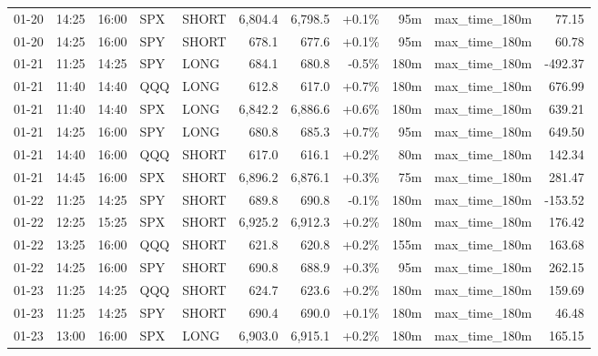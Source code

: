 \documentclass[11pt,a4paper,twoside]{article}
\begin{document}
\begin{center}
\begin{longtable}{>{\color{txtmain}}l l l l l r r r r >{\color{txtmain}}l r}
01-20 & 14:25 & 16:00 & SPX & SHORT & 6,804.4 & 6,798.5 & \textcolor{wingreen}{+0.1\%} & 95m & max\_time\_180m & \textcolor{wingreen}{77.15} \\
01-20 & 14:25 & 16:00 & SPY & SHORT & 678.1 & 677.6 & \textcolor{wingreen}{+0.1\%} & 95m & max\_time\_180m & \textcolor{wingreen}{60.78} \\
01-21 & 11:25 & 14:25 & SPY & LONG & 684.1 & 680.8 & \textcolor{lossred}{-0.5\%} & 180m & max\_time\_180m & \textcolor{lossred}{-492.37} \\
01-21 & 11:40 & 14:40 & QQQ & LONG & 612.8 & 617.0 & \textcolor{wingreen}{+0.7\%} & 180m & max\_time\_180m & \textcolor{wingreen}{676.99} \\
01-21 & 11:40 & 14:40 & SPX & LONG & 6,842.2 & 6,886.6 & \textcolor{wingreen}{+0.6\%} & 180m & max\_time\_180m & \textcolor{wingreen}{639.21} \\
01-21 & 14:25 & 16:00 & SPY & LONG & 680.8 & 685.3 & \textcolor{wingreen}{+0.7\%} & 95m & max\_time\_180m & \textcolor{wingreen}{649.50} \\
01-21 & 14:40 & 16:00 & QQQ & SHORT & 617.0 & 616.1 & \textcolor{wingreen}{+0.2\%} & 80m & max\_time\_180m & \textcolor{wingreen}{142.34} \\
01-21 & 14:45 & 16:00 & SPX & SHORT & 6,896.2 & 6,876.1 & \textcolor{wingreen}{+0.3\%} & 75m & max\_time\_180m & \textcolor{wingreen}{281.47} \\
01-22 & 11:25 & 14:25 & SPY & SHORT & 689.8 & 690.8 & \textcolor{lossred}{-0.1\%} & 180m & max\_time\_180m & \textcolor{lossred}{-153.52} \\
01-22 & 12:25 & 15:25 & SPX & SHORT & 6,925.2 & 6,912.3 & \textcolor{wingreen}{+0.2\%} & 180m & max\_time\_180m & \textcolor{wingreen}{176.42} \\
01-22 & 13:25 & 16:00 & QQQ & SHORT & 621.8 & 620.8 & \textcolor{wingreen}{+0.2\%} & 155m & max\_time\_180m & \textcolor{wingreen}{163.68} \\
01-22 & 14:25 & 16:00 & SPY & SHORT & 690.8 & 688.9 & \textcolor{wingreen}{+0.3\%} & 95m & max\_time\_180m & \textcolor{wingreen}{262.15} \\
01-23 & 11:25 & 14:25 & QQQ & SHORT & 624.7 & 623.6 & \textcolor{wingreen}{+0.2\%} & 180m & max\_time\_180m & \textcolor{wingreen}{159.69} \\
01-23 & 11:25 & 14:25 & SPY & SHORT & 690.4 & 690.0 & \textcolor{wingreen}{+0.1\%} & 180m & max\_time\_180m & \textcolor{wingreen}{46.48} \\
01-23 & 13:00 & 16:00 & SPX & LONG & 6,903.0 & 6,915.1 & \textcolor{wingreen}{+0.2\%} & 180m & max\_time\_180m & \textcolor{wingreen}{165.15} \\

\end{longtable}
\end{center}
\end{document}
